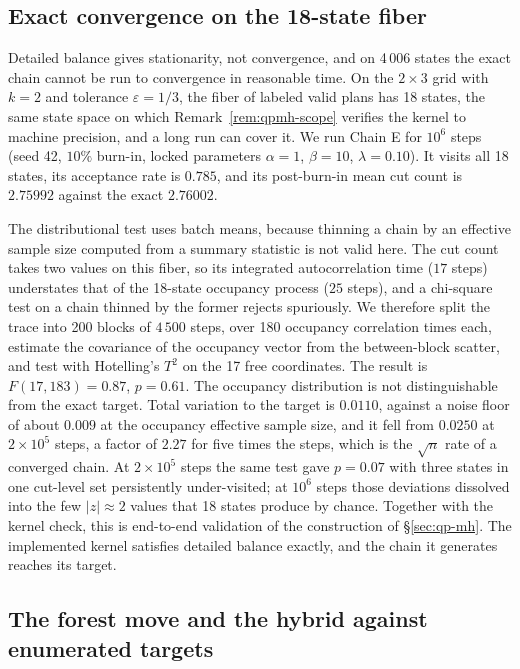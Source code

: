 \documentclass[11pt]{article}
\begin{document}
\subsection{Exact convergence on the 18-state fiber}\label{sec:exp-2x3}

Detailed balance gives stationarity, not convergence, and on 4\,006
states the exact chain cannot be run to convergence in reasonable
time. On the $2 \times 3$ grid with $k = 2$ and tolerance
$\varepsilon = 1/3$, the fiber of labeled valid plans has 18 states,
the same state space on which Remark~\ref{rem:qpmh-scope} verifies
the kernel to machine precision, and a long run can cover it. We run
Chain E for $10^6$ steps (seed 42, $10\%$ burn-in, locked parameters
$\alpha = 1$, $\beta = 10$, $\lambda = 0.10$). It visits all 18
states, its acceptance rate is $0.785$, and its post-burn-in mean cut
count is $2.75992$ against the exact $2.76002$.

The distributional test uses batch means, because thinning a chain by
an effective sample size computed from a summary statistic is not
valid here. The cut count takes two values on this fiber, so its
integrated autocorrelation time ($17$ steps) understates that of the
18-state occupancy process ($25$ steps), and a chi-square test on a
chain thinned by the former rejects spuriously. We therefore split
the trace into 200 blocks of $4\,500$ steps, over 180 occupancy
correlation times each, estimate the covariance of the occupancy
vector from the between-block scatter, and test with Hotelling's
$T^2$ on the 17 free coordinates. The result is $F(17, 183) = 0.87$,
$p = 0.61$. The occupancy distribution is not distinguishable from
the exact target. Total variation to the target is $0.0110$, against
a noise floor of about $0.009$ at the occupancy effective sample
size, and it fell from $0.0250$ at $2 \times 10^5$ steps, a factor of
$2.27$ for five times the steps, which is the $\sqrt{n}$ rate of a
converged chain. At $2 \times 10^5$ steps the same test gave
$p = 0.07$ with three states in one cut-level set persistently
under-visited; at $10^6$ steps those deviations dissolved into the
few $|z| \approx 2$ values that 18 states produce by chance.
Together with the kernel check, this is end-to-end validation of the
construction of \S\ref{sec:qp-mh}. The implemented kernel satisfies
detailed balance exactly, and the chain it generates reaches its
target.

\subsection{The forest move and the hybrid against enumerated targets}\label{sec:exp-hybrid}
\end{document}
